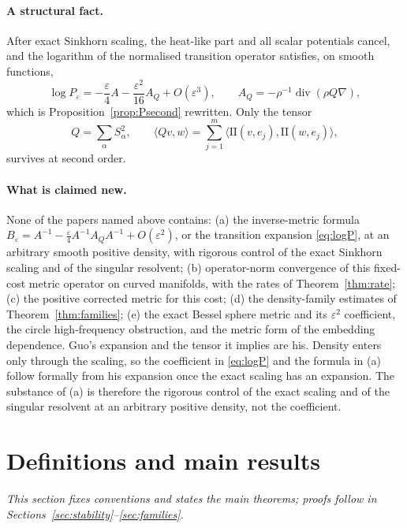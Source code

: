 \documentclass[11pt,a4paper]{article}
\theoremstyle{definition}\newtheorem{definition}[theorem]{Definition}
\theoremstyle{remark}\newtheorem{remark}[theorem]{Remark}
\newcommand{\eps}{\varepsilon}
\newcommand{\diver}{\operatorname{div}}
\newcommand{\II}{\mathrm{II}}
\begin{document}
\paragraph{A structural fact.} After exact Sinkhorn scaling, the heat-like part and all scalar potentials cancel, and the logarithm of the normalised transition operator satisfies, on smooth functions,
\begin{equation}\label{eq:logP}
\log P_\eps=-\frac\eps4A-\frac{\eps^2}{16}A_Q+O(\eps^3),
\qquad A_Q=-\rho^{-1}\diver(\rho Q\nabla),
\end{equation}
which is Proposition~\ref{prop:Psecond} rewritten. Only the tensor
\begin{equation}\label{eq:Q}
Q=\sum_\alpha S_\alpha^2,\qquad
\langle Qv,w\rangle=\sum_{j=1}^m\langle\II(v,e_j),\II(w,e_j)\rangle,
\end{equation}
survives at second order.

\paragraph{What is claimed new.} None of the papers named above contains: (a) the inverse-metric formula $B_\eps=A^{-1}-\tfrac\eps4A^{-1}A_QA^{-1}+O(\eps^2)$, or the transition expansion \eqref{eq:logP}, at an arbitrary smooth positive density, with rigorous control of the exact Sinkhorn scaling and of the singular resolvent; (b) operator-norm convergence of this fixed-cost metric operator on curved manifolds, with the rates of Theorem~\ref{thm:rate}; (c) the positive corrected metric for this cost; (d) the density-family estimates of Theorem~\ref{thm:families}; (e) the exact Bessel sphere metric and its $\eps^2$ coefficient, the circle high-frequency obstruction, and the metric form of the embedding dependence. Guo's expansion and the tensor it implies are his. Density enters only through the scaling, so the coefficient in \eqref{eq:logP} and the formula in (a) follow formally from his expansion once the exact scaling has an expansion. The substance of (a) is therefore the rigorous control of the exact scaling and of the singular resolvent at an arbitrary positive density, not the coefficient.

\section{Definitions and main results}\label{sec:defs}

\noindent\emph{This section fixes conventions and states the main theorems; proofs follow in Sections~\ref{sec:stability}--\ref{sec:families}.}
\end{document}
